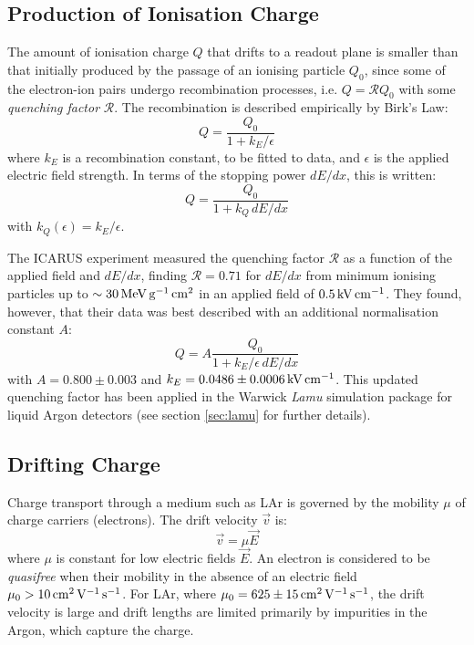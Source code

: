 \subsection{Production of Ionisation Charge}\label{sec:production-ionisation-charge}
The amount of ionisation charge $Q$ that drifts to a readout plane is smaller than that initially produced by the passage of an ionising particle $Q_0$, since some of the electron-ion pairs undergo recombination processes, i.e. $Q = \mathcal{R}Q_0$ with some \emph{quenching factor} $\mathcal{R}$. The recombination is described empirically by Birk's Law\citep{Birks1964}:
\begin{equation}\label{eqn:birks_law}
    Q = \frac{Q_0}{1 + k_E / \epsilon}
\end{equation}
where $k_E$ is a recombination constant, to be fitted to data, and $\epsilon$ is the applied electric field strength. In terms of the stopping power $dE/dx$, this is written:
\begin{equation}\label{eqn:birks_law_dEdx}
    Q = \frac{Q_0}{1 + k_Q\, dE/dx}
\end{equation}
with $k_Q(\epsilon) = k_E / \epsilon$.

The ICARUS experiment\citep{Amoruso2004} measured the quenching factor $\mathcal{R}$ as a function of the applied field and $dE/dx$, finding $\mathcal{R} = 0.71$ for $dE/dx$ from minimum ionising particles up to $\sim 30 \,\mathrm{MeV} \,\mathrm{g}^{-1} \,\mathrm{cm}^2$ in an applied field of $0.5 \,\mathrm{kV} \,\mathrm{cm}^{-1}$. They found, however, that their data was best described with an additional normalisation constant $A$:
\begin{equation}\label{eqn:icarus_quenching}
Q = A\frac{Q_0}{1 + k_E/\epsilon \, dE/dx}
\end{equation}
with $A=0.800\pm0.003$ and $k_E = 0.0486\pm 0.0006 \,\mathrm{kV} \,\mathrm{cm}^{-1}$. This updated quenching factor has been applied in the Warwick \emph{Lamu} simulation package for liquid Argon detectors (see section \ref{sec:lamu} for further details).

\subsection{Drifting Charge}
Charge transport through a medium such as \ac{LAr} is governed by the mobility $\mu$ of charge carriers (electrons)\citep{Aprile2006}. The drift velocity $\vec{v}$ is:
\begin{equation}\label{eqn:charge_transport}
    \vec{v} = \mu \vec{E}
\end{equation}
where $\mu$ is constant for low electric fields $\vec{E}$. An electron is considered to be \emph{quasifree} when their mobility in the absence of an electric field $\mu_0 > 10 \,\mathrm{cm}^2 \,\mathrm{V}^{-1} \,\mathrm{s}^{-1}$. For \ac{LAr}, where $\mu_0 = 625 \pm 15 \,\mathrm{cm}^2 \,\mathrm{V}^{-1} \,\mathrm{s}^{-1}$\citep{Aprile2006}, the drift velocity is large and drift lengths are limited primarily by impurities in the Argon, which capture the charge.

